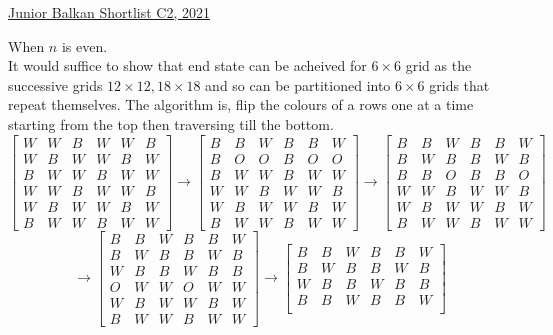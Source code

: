\begin{problem}{4}{\href{https://artofproblemsolving.com/community/c6h2876405p34326572}{Junior Balkan Shortlist C2, 2021}}
\begin{solution}
\begin{mycases}
		\item When $n$ is even.\\
It would suffice to show that end state can be acheived for $6\times 6$ grid as the successive grids $12\times 12, 18\times 18$ and so can be partitioned into $6\times 6$ grids that repeat themselves. The algorithm is, flip the colours of a rows one at a time starting from the top then traversing till the bottom.
$$ 
\begin{bmatrix}
		W & W & B & W & W & B\\
		W & B & W & W & B & W\\
		B & W & W & B & W & W\\
		W & W & B & W & W & B\\
		W & B & W & W & B & W\\
		B & W & W & B & W & W
	\end{bmatrix} \to\begin{bmatrix}
		B & B & W & B & B & W\\
		B & O & O& B & O & O\\
		B & W & W & B & W & W\\
		W & W & B & W & W & B\\
		W & B & W & W & B & W\\
		B & W & W & B & W & W
	\end{bmatrix} \to \begin{bmatrix}
		B & B & W & B & B & W\\
		B & W & B & B & W & B\\
		B & B & O & B & B & O\\
		W & W & B & W & W & B\\
		W & B & W & W & B & W\\
		B & W & W & B & W & W
	\end{bmatrix}
$$$$
	\to \begin{bmatrix}
		B & B & W & B & B & W\\
		B & W & B & B & W & B\\
		W & B & B & W & B & B\\
		O & W & W & O & W & W\\
		W & B & W & W & B & W\\
		B & W & W & B & W & W
	\end{bmatrix} \to \begin{bmatrix}
		B & B & W & B & B & W\\
		B & W & B & B & W & B\\
		W & B & B & W & B & B\\
		B & B & W & B & B & W\\

\end{bmatrix}$$
\end{mycases}
\end{solution}
\end{problem}
